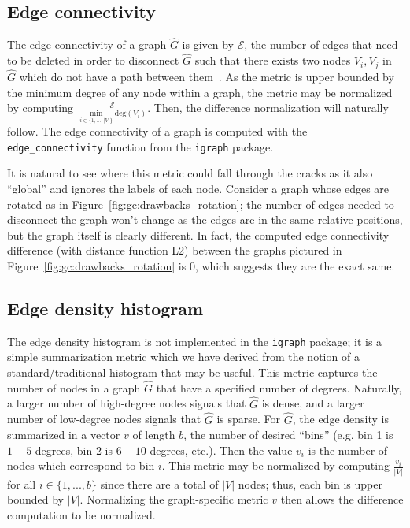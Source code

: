 \subsection{Edge connectivity}

The edge connectivity of a graph $\hat{G}$ is given by $\mathcal{E}$, the 
number of edges that need to be deleted in order to disconnect 
$\hat{G}$ such that there exists two nodes $V_i,V_j$ in $\hat{G}$ which do not 
have a path between them~\cite{igraph}.
As the metric is upper bounded by the minimum 
degree of any node within a graph, the metric may be normalized by computing 
$\frac{\mathcal{E}}{\min\limits_{i \in \{1,...,|V|\}} \text{deg}(V_i)}$. Then, 
the difference normalization will naturally follow.
The edge connectivity of a graph is computed 
with the \texttt{edge\_connectivity} function from the \texttt{igraph} package. 

It is natural to see where this metric could fall through the cracks as it also 
``global'' and ignores the labels of each node. Consider 
a graph whose edges are rotated as in Figure~\ref{fig:gc:drawbacks_rotation}; 
the number of edges needed to disconnect the graph won't change as the edges 
are in the same relative positions, but the graph itself is clearly different. 
In fact, the computed edge connectivity difference (with distance function L2) 
between the graphs pictured in Figure~\ref{fig:gc:drawbacks_rotation} is 0, 
which suggests they are the exact same.

\subsection{Edge density histogram}

The edge density histogram is not implemented in the \texttt{igraph} package; 
it is a simple summarization metric which we have derived from the notion of a 
standard/traditional histogram that may be useful. 
This metric captures the number of nodes in a graph $\hat{G}$ that have a 
specified number of degrees. Naturally, a larger number of high-degree nodes 
signals that $\hat{G}$ is dense, and a larger number of low-degree nodes 
signals that $\hat{G}$ is sparse. For 
$\hat{G}$, the edge density is summarized in a 
vector $v$ of length $b$, the number of desired ``bins'' 
(e.g. bin 1 is $1-5$ degrees, bin 2 is $6-10$ degrees, etc.). Then the value 
$v_i$ is the number of nodes which correspond to bin $i$. This 
metric may be normalized by computing $\frac{v_i}{|V|}$ for 
all $i \in \{1,...,b\}$ since there are a total of $|V|$ nodes; thus, each bin 
is upper bounded by $|V|$. Normalizing the graph-specific metric $v$ then
allows the difference computation to be normalized. 

